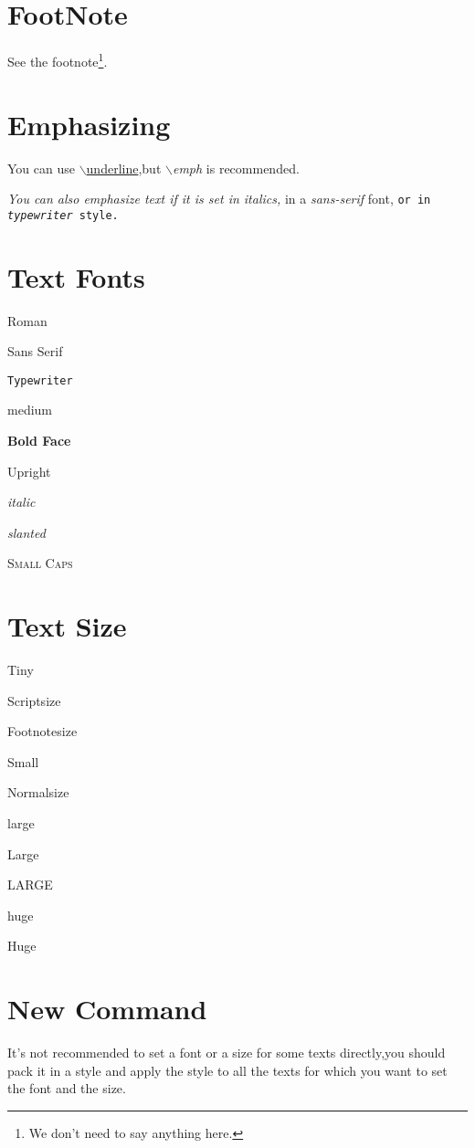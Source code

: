 \documentclass[a4paper]{report}
\begin{document}
\section{FootNote}
See the footnote\footnote{We don't need to say anything here.}.

\section{Emphasizing}
You can use \underline{$\backslash$underline},but
\emph{$\backslash$emph} is recommended.

\textit{You can also \emph{emphasize} text if it is set in italics,}
\textsf{in a \emph{sans-serif} font,} \texttt{or in
\emph{typewriter} style.}

\section{Text Fonts}
\textrm{Roman}

\textsf{Sans Serif}

\texttt{Typewriter}

\textmd{medium}

\textbf{Bold Face}

\textup{Upright}

\textit{italic}

\textsl{slanted}

\textsc{Small Caps}

\section{Text Size}

\tiny{Tiny}

\scriptsize{Scriptsize}

\footnotesize{Footnotesize}

\small{Small}

\normalsize{Normalsize}

\large{large}

\Large{Large}

\LARGE{LARGE}

\huge{huge}

\Huge{Huge}

\normalsize{} %

\section{New Command}

It's not recommended to set a font or a size for some texts
directly,you should pack it in a style and apply the style to all
the texts for which you want to set the font and the size.
\end{document}
